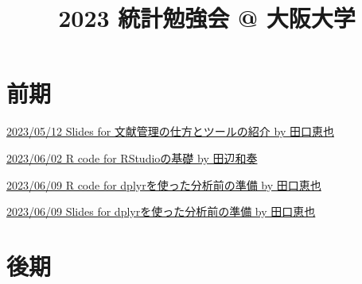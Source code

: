 \documentclass[
]{article}
\title{2023 統計勉強会 @ 大阪大学}
\author{}
\date{\vspace{-2.5em}}
\begin{document}
\maketitle

{
\setcounter{tocdepth}{2}
\tableofcontents
}
\hypertarget{ux524dux671f}{%
\section{前期}\label{ux524dux671f}}

\href{https://www.dropbox.com/s/pm2rsg1kxyrso7e/20230512_IntroductionToLiteratureManagementTechniquesAndTools_Taguchi.pptx?dl=0}{2023/05/12
Slides for 文献管理の仕方とツールの紹介 by 田口恵也}

\href{http://htmlpreview.github.io/?https://github.com/atsushikanayama/statistics/blob/main/2023StatsStudySessions\%40OsakaUniversity/20230602_RStudioBasics_Tanabe.html}{2023/06/02
R code for RStudioの基礎 by 田辺和奏}

\href{http://htmlpreview.github.io/?https://github.com/atsushikanayama/statistics/blob/main/2023StatsStudySessions\%40OsakaUniversity/20230609_UsingDplyr_Taguchi.html}{2023/06/09
R code for dplyrを使った分析前の準備 by 田口恵也}

\href{https://www.dropbox.com/s/ule3t2x34ftmhz7/20230609_UsingDplyr_Taguchi.pptx?dl=0}{2023/06/09
Slides for dplyrを使った分析前の準備 by 田口恵也}

\hypertarget{ux5f8cux671f}{%
\section{後期}\label{ux5f8cux671f}}
\end{document}
